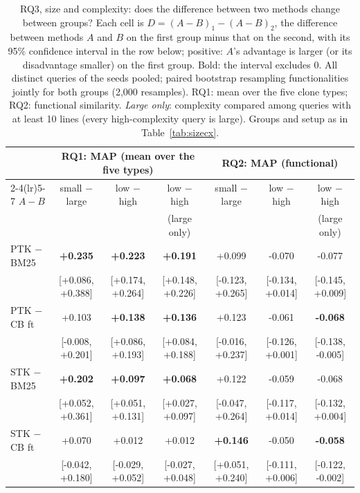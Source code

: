 \begin{table}[!htbp]
\centering
\caption{RQ3, size and complexity: does the difference between two methods change between groups? Each cell is $D = (A - B)_{1} - (A - B)_{2}$, the difference between methods $A$ and $B$ on the first group minus that on the second, with its 95\% confidence interval in the row below; positive: $A$'s advantage is larger (or its disadvantage smaller) on the first group. Bold: the interval excludes 0. All distinct queries of the seeds pooled; paired bootstrap resampling functionalities jointly for both groups (2,000 resamples). RQ1: mean over the five clone types; RQ2: functional similarity. \emph{Large only}: complexity compared among queries with at least 10 lines (every high-complexity query is large). Groups and setup as in Table~\ref{tab:sizecx}.}
\label{tab:sizecxint}
\scriptsize
\setlength{\tabcolsep}{3pt}
\begin{tabular}{lcccccc}
\toprule
 & \multicolumn{3}{c}{RQ1: MAP (mean over the five types)} & \multicolumn{3}{c}{RQ2: MAP (functional)} \\ \cmidrule(lr){2-4}\cmidrule(lr){5-7}
$A - B$ & small $-$ large & low $-$ high & low $-$ high & small $-$ large & low $-$ high & low $-$ high \\
 &  &  & (large only) &  &  & (large only) \\
\midrule
\quad PTK $-$ BM25 & \textbf{+0.235} & \textbf{+0.223} & \textbf{+0.191} & +0.099 & -0.070 & -0.077 \\
 & [+0.086, +0.388] & [+0.174, +0.264] & [+0.148, +0.226] & [-0.123, +0.265] & [-0.134, +0.014] & [-0.145, +0.009] \\[2pt]
\quad PTK $-$ CB ft & +0.103 & \textbf{+0.138} & \textbf{+0.136} & +0.123 & -0.061 & \textbf{-0.068} \\
 & [-0.008, +0.201] & [+0.086, +0.193] & [+0.084, +0.188] & [-0.016, +0.237] & [-0.126, +0.001] & [-0.138, -0.005] \\[2pt]
\quad STK $-$ BM25 & \textbf{+0.202} & \textbf{+0.097} & \textbf{+0.068} & +0.122 & -0.059 & -0.068 \\
 & [+0.052, +0.361] & [+0.051, +0.131] & [+0.027, +0.097] & [-0.047, +0.264] & [-0.117, +0.014] & [-0.132, +0.004] \\[2pt]
\quad STK $-$ CB ft & +0.070 & +0.012 & +0.012 & \textbf{+0.146} & -0.050 & \textbf{-0.058} \\
 & [-0.042, +0.180] & [-0.029, +0.052] & [-0.027, +0.048] & [+0.051, +0.240] & [-0.111, +0.006] & [-0.122, -0.002] \\[2pt]

\end{tabular}
\end{table}

